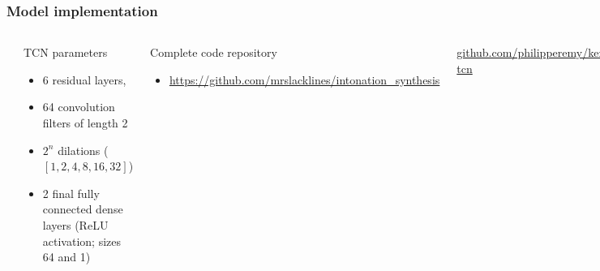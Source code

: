 \documentclass[a4paper,9pt]{beamer}
\theoremstyle{mytheoremstyle}
\begin{document}
\begin{frame}
\frametitle{Model implementation}
\begin{columns}
\begin{center}
  \includegraphics[width=\textwidth]{res/tcn}
\end{center}
\scriptsize{
\begin{exampleblock}{TCN parameters}
\begin{itemize}
\item 6 residual layers,
\item 64 convolution filters of length 2
\item $2^n$ dilations ($[1, 2, 4, 8, 16, 32]$)
\item 2 final fully connected dense layers (ReLU activation; sizes 64 and 1)
\end{itemize}
\end{exampleblock}
\begin{exampleblock}{Complete code repository}
\begin{itemize}
\item[\checkmark] \url{https://github.com/mrslacklines/intonation_synthesis}
\end{itemize}
\end{exampleblock}
\begin{block}
{}
\scriptsize{\url{github.com/philipperemy/keras-tcn}\\
\parencite{remy2020}}
\end{block}
}
\end{columns}
\end{frame}
\end{document}
